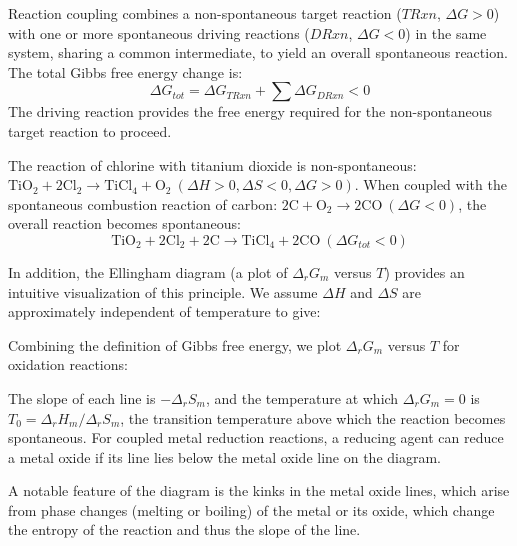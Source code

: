 \begin{definition}
Reaction coupling combines a non-spontaneous target reaction ($TRxn$, $\Delta G > 0$) with one or more spontaneous driving reactions ($DRxn$, $\Delta G < 0$) in the same system, sharing a common intermediate, to yield an overall spontaneous reaction. The total Gibbs free energy change is:
$$\Delta G_{tot} = \Delta G_{TRxn} + \sum \Delta G_{DRxn} < 0$$
The driving reaction provides the free energy required for the non-spontaneous target reaction to proceed.
\end{definition}

\begin{example}
The reaction of chlorine with titanium dioxide is non-spontaneous: $\text{TiO}_2 + 2\text{Cl}_2 \to \text{TiCl}_4 + \text{O}_2 \ (\Delta H > 0, \Delta S < 0, \Delta G > 0)$. When coupled with the spontaneous combustion reaction of carbon: $2\text{C} + \text{O}_2 \to 2\text{CO} \ (\Delta G < 0)$, the overall reaction becomes spontaneous:
$$\text{TiO}_2 + 2\text{Cl}_2 + 2\text{C} \to \text{TiCl}_4 + 2\text{CO} \ (\Delta G_{tot} < 0)$$
\end{example}

In addition, the Ellingham diagram (a plot of $\Delta_r G_m$ versus $T$) provides an intuitive visualization of this principle. We assume $\Delta H$ and $\Delta S$ are approximately independent of temperature to give:
\begin{definition}
Combining the definition of Gibbs free energy, we plot $\Delta_r G_m$ versus $T$ for oxidation reactions:
  \begin{center}
\end{center}

The slope of each line is $-\Delta_r S_m$, and the temperature at which $\Delta_r G_m = 0$ is $T_0 = {\Delta_r H_m}/{\Delta_r S_m}$, the transition temperature above which the reaction becomes spontaneous. For coupled metal reduction reactions, a reducing agent can reduce a metal oxide if its line lies below the metal oxide line on the diagram.

A notable feature of the diagram is the kinks in the metal oxide lines, which arise from phase changes (melting or boiling) of the metal or its oxide, which change the entropy of the reaction and thus the slope of the line.
\end{definition}

\newpage
